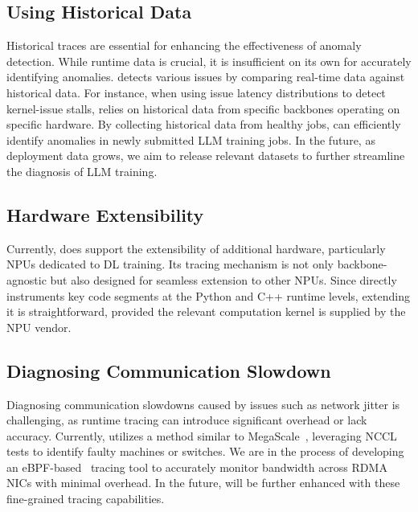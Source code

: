 \subsection{Using Historical Data}
Historical traces are essential for enhancing the effectiveness of anomaly detection. While runtime data is crucial, it is insufficient on its own for accurately identifying anomalies. \sysname{} detects various issues by comparing real-time data against historical data. For instance, when using issue latency distributions to detect kernel-issue stalls, \sysname{} relies on historical data from specific backbones operating on specific hardware. By collecting historical data from healthy jobs, \sysname{} can efficiently identify anomalies in newly submitted LLM training jobs. In the future, as deployment data grows, we aim to release relevant datasets to further streamline the diagnosis of LLM training.

\subsection{Hardware Extensibility}
Currently, \sysname{} does support the extensibility of additional hardware, particularly NPUs dedicated to DL training. Its tracing mechanism is not only backbone-agnostic but also designed for seamless extension to other NPUs. Since \sysname{} directly instruments key code segments at the Python and C++ runtime levels, extending it is straightforward, provided the relevant computation kernel is supplied by the NPU vendor.


\subsection{Diagnosing Communication Slowdown}
Diagnosing communication slowdowns caused by issues such as network jitter is challenging, as runtime tracing can introduce significant overhead or lack accuracy. Currently, \sysname{} utilizes a method similar to MegaScale~\cite{jiangMegaScaleScaling}, leveraging NCCL tests to identify faulty machines or switches. We are in the process of developing an eBPF-based~\cite{ebpf} tracing tool to accurately monitor bandwidth across RDMA NICs with minimal overhead. In the future, \sysname{} will be further enhanced with these fine-grained tracing capabilities.